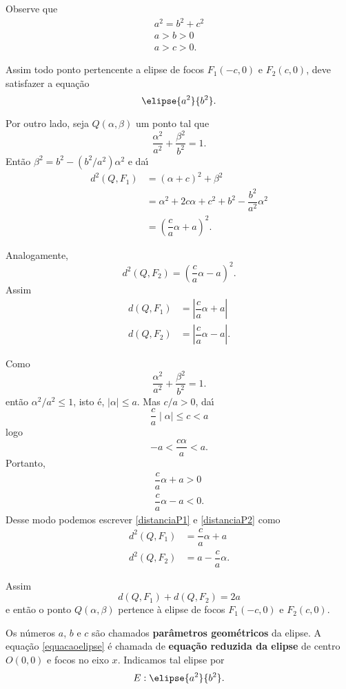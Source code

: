 Observe que
\begin{align}
  a^2 = b^2 + c^2\\
  a > b > 0\\
  a > c > 0.
\end{align}

Assim todo ponto pertencente a elipse de focos $F_1(-c,0)$ e $F_2(c,0)$, deve satisfazer a equa\c{c}\~ao
\[
  \elipse{a^2}{b^2}.
\]

Por outro lado, seja $Q(\alpha,\beta)$ um ponto tal que
\[
  \dfrac{\alpha^2}{a^2} + \dfrac{\beta^2}{b^2} = 1.
\]
Ent\~ao $\beta^2 = b^2 - (b^2/a^2)\alpha^2$ e da{\'\i}
\begin{align*}
  d^2(Q,F_1) &= (\alpha + c)^2 + \beta^2\\
&= \alpha^2 + 2c\alpha + c^2 + b^2 - \dfrac{b^2}{a^2}\alpha^2\\
&= \left(\dfrac{c}{a}\alpha + a\right)^2.
\end{align*}

Analogamente,
\begin{equation*}
  d^2(Q,F_2) = \left(\dfrac{c}{a}\alpha - a\right)^2.
\end{equation*}
Assim
\begin{align}
  d(Q,F_1) &= \left|\dfrac{c}{a}\alpha + a\right|\label{distanciaP1}\\
  d(Q,F_2) &= \left|\dfrac{c}{a}\alpha - a\right|\label{distanciaP2}.
\end{align}

Como
\[
  \dfrac{\alpha^2}{a^2} + \dfrac{\beta^2}{b^2} = 1.
\]
ent\~ao $\alpha^2/a^2 \le 1$, isto \'e, $\mid\alpha\mid\le a$. Mas $c/a > 0$, da{\'\i}
\[
  \dfrac{c}{a}\mid\alpha\mid \le c < a
\]
logo
\[
  -a < \dfrac{c\alpha}{a} < a.
\]
Portanto,
\begin{align*}
  \dfrac{c}{a}\alpha + a > 0\\
  \dfrac{c}{a}\alpha - a < 0.
\end{align*}
Desse modo podemos escrever \eqref{distanciaP1} e \eqref{distanciaP2} como
\begin{align*}
  d^2(Q,F_1) &= \dfrac{c}{a}\alpha + a\\
  d^2(Q,F_2) &= a - \dfrac{c}{a}\alpha.
\end{align*}

Assim
\[
  d(Q,F_1) + d(Q,F_2) = 2a
\]
e ent\~ao o ponto $Q(\alpha,\beta)$ pertence \`a elipse de focos $F_1(-c,0)$ e $F_2(c,0)$.

Os n\'umeros $a$, $b$ e $c$ s\~ao chamados \textbf{par\^ametros geom\'etricos} da elipse. A equa\c{c}\~ao \eqref{equacaoelipse} \'e chamada de \textbf{equa\c{c}\~ao reduzida da elipse} de centro $O(0,0)$ e focos no eixo $x$. Indicamos tal elipse por 
\[
  E: \elipse{a^2}{b^2}.
\]

